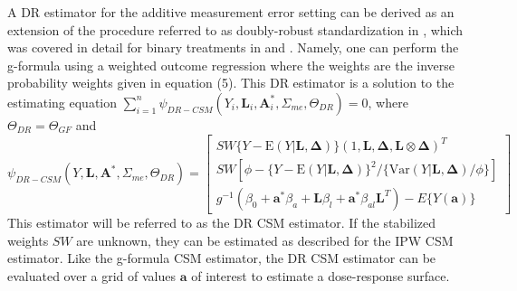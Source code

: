 \documentclass[useAMS,usenatbib,referee]{biom}
\begin{document}
A DR estimator for the additive measurement error setting can be derived as an extension of the procedure referred to as doubly-robust standardization in \citet{vansteelandt2011}, which was covered in detail for binary treatments in \citet{hirano2001} and \citet{kang2007}. Namely, one can perform the g-formula using a weighted outcome regression where the weights are the inverse probability weights given in equation (5). This DR estimator is a solution to the estimating equation $\sum_{i=1}^{n} \psi_{DR-CSM}(Y_{i}, \bm{L}_{i}, \bm{A}_{i}^{*}, \Sigma_{me}, \Theta_{DR}) = 0$, where $\Theta_{DR} = \Theta_{GF}$ and
\begin{equation}
    \psi_{DR-CSM}(Y, \bm{L}, \bm{A}^{*}, \Sigma_{me}, \Theta_{DR}) =
    \begin{bmatrix}
       SW\{ Y - \text{E}(Y | \bm{L}, \bm{\Delta}) \} (1, \bm{L}, \bm{\Delta}, \bm{L} \otimes \bm{\Delta})^{T} \\
        SW[\phi - \{ Y - \text{E}(Y | \bm{L}, \bm{\Delta}) \}^{2} / \{ \text{Var}(Y | \bm{L}, \bm{\Delta}) / \phi \}] \\
        g^{-1}(\beta_{0} + \bm{a}^{*}\beta_{a} + \bm{L}\beta_{l} +
        \bm{a}^{*}\beta_{al}\bm{L}^{T}) - E \{ Y(\bm{a}) \}
    \end{bmatrix}
\end{equation}
This estimator will be referred to as the DR CSM estimator. If the stabilized weights $SW$ are unknown, they can be estimated as described for the IPW CSM estimator. Like the g-formula CSM estimator, the DR CSM estimator can be evaluated over a grid of values $\bm{a}$ of interest to estimate a dose-response surface.
\end{document}
